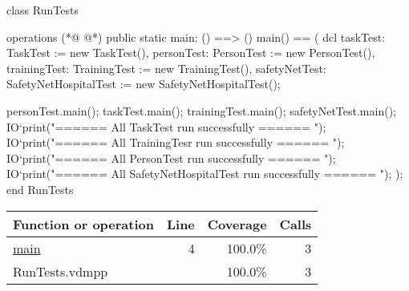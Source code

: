 \begin{vdmpp}[breaklines=true]
class RunTests

operations
(*@
\label{main:4}
@*)
 public static main: () ==> ()
   main() == (
    dcl taskTest: TaskTest := new TaskTest(), personTest: PersonTest := new PersonTest(), 
     trainingTest: TrainingTest := new TrainingTest(), safetyNetTest: SafetyNetHospitalTest := new SafetyNetHospitalTest();
    
    personTest.main();
    taskTest.main(); 
    trainingTest.main();
    safetyNetTest.main();
    IO`print("\n\n ====== All TaskTest run successfully ====== \n\n");
    IO`print("\n\n ====== All TrainingTesr run successfully ====== \n\n");
    IO`print("\n\n ====== All PersonTest run successfully ====== \n\n");
   IO`print("\n\n ====== All SafetyNetHospitalTest run successfully ====== \n\n");
   );
end RunTests
\end{vdmpp}
\bigskip
\begin{longtable}{|l|r|r|r|}
\hline
Function or operation & Line & Coverage & Calls \\
\hline
\hline
\hyperref[main:4]{main} & 4&100.0\% & 3 \\
\hline
\hline
RunTests.vdmpp & & 100.0\% & 3 \\
\hline
\end{longtable}

